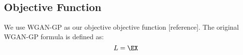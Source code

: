 \subsection{Objective Function}
We use WGAN-GP as our objective objective function [reference]. The original WGAN-GP formula is defined as:
\begin{equation}
\label{eqn:WGAN-GP}
L = \EX
\end{equation}